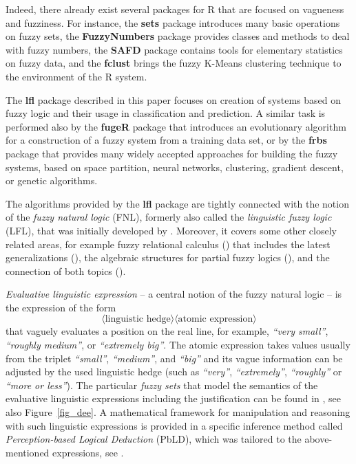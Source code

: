 \documentclass[review]{elsarticle}
\newcommand{\pkg}[1]{\textbf{#1}}
\newcommand{\proglang}[1]{#1}
\newcommand{\R}{\proglang{R}}
\begin{document}
Indeed, there already exist several packages for \R{} that are focused on vagueness and fuzziness. For
instance, the \pkg{sets}
package \citep{setsPkg} introduces many basic operations on fuzzy sets, the \pkg{FuzzyNumbers}
package \citep{FuzzyNumbersPkg} provides classes and methods to deal with fuzzy numbers,
the \pkg{SAFD} package \citep{safdPkg} contains tools for elementary statistics on fuzzy data, and
the \pkg{fclust} \citep{fclustPkg} brings the fuzzy K-Means clustering technique to the environment of
the \R{} system.

The \pkg{lfl} package described in this paper focuses on creation of systems based on fuzzy logic and their
usage in classification and prediction. A similar task is performed also by the \pkg{fugeR}
package \citep{fugeRPkg} that introduces an evolutionary algorithm for a construction of a fuzzy system from
a training data set, or by the \pkg{frbs} package \citep{frbsPkg} that provides many widely
accepted approaches for building the fuzzy systems, based on space partition, neural networks,
clustering, gradient descent, or genetic algorithms.

The algorithms provided by the \pkg{lfl} package are tightly connected with the notion of
the \emph{fuzzy natural logic} (FNL), formerly also called the \emph{linguistic fuzzy logic} (LFL),
that was initially developed by \cite{Novak08}. Moreover, it covers some other closely related areas, for example fuzzy relational calculus  (\cite{BandlerKohout78,Belohlavek_book2002,Behounek:Compositions})  that includes the latest generalizations (\cite{Cao2017, Cao2017b}), the algebraic structures for partial fuzzy logics (\cite{BehounekNovak:IEEE15, BehounekDankova:IPMU16}), and the connection of both topics (\cite{Step_etal_Dragon_IJAR2019}).

\emph{Evaluative linguistic expression} -- a central notion of the fuzzy natural logic -- is the expression of the form
%
$$\langle \textrm{linguistic hedge}\rangle \langle \textrm{atomic expression}\rangle$$
%
that vaguely evaluates a position on the real line, for example, \emph{``very small''}, \emph{``roughly medium''}, or \emph{``extremely big''}. The atomic expression takes values usually from the triplet 
\emph{``small''}, \emph{``medium''}, and \emph{``big''} and its vague information can be adjusted by the used linguistic hedge (such as \emph{``very''}, \emph{``extremely''}, \emph{``roughly''} or \emph{``more or less''}).
The particular \emph{fuzzy sets} that model the semantics of the evaluative linguistic expressions including the justification can be found in \cite{Novak08}, see also Figure~\ref{fig_dee}. A mathematical framework for manipulation and reasoning with
such linguistic expressions is provided in a specific inference method called  \emph{Perception-based
Logical Deduction} (PbLD), which was tailored to the above-mentioned expressions, see \cite{Dvovrak2004formal,Novak:PbLD, Dvorak_etal:RedundancyFSS}.
\end{document}
